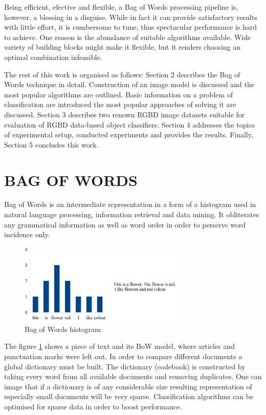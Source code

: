 \documentclass[11pt,twoside]{article}
\begin{document}
  Being efficient, efective and flexible, a Bag of Words processing pipeline is, however, a blessing in a disguise. While in fact it can provide satisfactory results with little effort, it is cumbersome to tune, thus spectacular performance is hard to achieve. One reason is the abundance of suitable algorithms available. Wide variety of building blocks might make it flexible, but it renders choosing an optimal combination infeasible.

  The rest of this work is organised as follows: Section 2 describes the Bag of Words technique in detail. Construction of an image model is discussed and the most popular algorithms are outlined. Basic information on a problem of classification are introduced the most popular approaches of solving it are discussed. Section 3 describes two renown RGBD image datasets suitable for evaluation of RGBD data-based object classifiers. Section 4 addresses the topics of experimental setup, conducted experiments and provides the results. Finally, Section 5 concludes this work.

\section{ BAG OF WORDS }

  Bag of Words is an intermediate representation in a form of a histogram used in natural language processing, information retrieval and data mining. It obliterates any grammatical information as well as word order in order to perserve word incidence only.

  \begin{figure}[!ht]
  \centering
  \includegraphics[width=0.7\textwidth]{../figs/bow_example}
  \caption{Bag of Words histogram}
  \label{fig:bow_example}
  \end{figure}

  The figure \ref{fig:bow_example} shows a piece of text and its BoW model, where articles and punctuation marks were left out. In order to compare different documents a global dictionary must be built. The dictionary (codebook) is constructed by taking every word from all available documents and removing duplicates. One can image that if a dictionary is of any considerable size resulting representation of especially small documents will be very sparse. Classification algorithms can be optimised for sparse data in order to boost performance.
\end{document}
